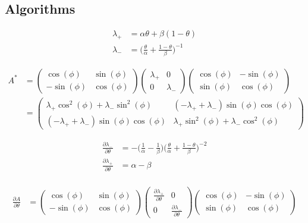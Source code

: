 \documentclass[11pt]{article}
\begin{document}
\newpage
\begin{appendix}
\section{Algorithms}
\begin{align*}
\lambda_+ &= \alpha\theta+\beta(1-\theta)\\[2ex]
\lambda_- &= \bigg(\frac{\theta}{\alpha} + \frac{1-\theta}{\beta}\bigg)^{-1}
\end{align*}

\begin{align*}
A^* &= \begin{pmatrix} \cos(\phi) & \sin(\phi)\\ -\sin(\phi) & \cos(\phi)\end{pmatrix}
\begin{pmatrix} \lambda_+ & 0\\ 0 & \lambda_-\end{pmatrix}
\begin{pmatrix} \cos(\phi) & -\sin(\phi)\\ \sin(\phi) & \cos(\phi)\end{pmatrix}\\[2ex]
&=\begin{pmatrix}
\lambda_+\cos^2(\phi)+\lambda_-\sin^2(\phi) & (-\lambda_++\lambda_-)\sin(\phi)\cos(\phi)
\\ (-\lambda_++\lambda_-)\sin(\phi)\cos(\phi) & \lambda_+\sin^2(\phi)+\lambda_-\cos^2(\phi)
\end{pmatrix}\end{align*}

\begin{align*}
\frac{\partial\lambda_-}{\partial\theta} &= -\bigg(\frac{1}{\alpha} - \frac{1}{\beta}\bigg)\bigg(\frac{\theta}{\alpha} + \frac{1-\theta}{\beta}\bigg)^{-2}\\
\frac{\partial\lambda_+}{\partial\theta} &= \alpha-\beta\\
\end{align*}

\begin{align*}
\frac{\partial A}{\partial\theta} &= \begin{pmatrix} \cos(\phi) & \sin(\phi)\\ -\sin(\phi) & \cos(\phi)\end{pmatrix}
\begin{pmatrix} \frac{\partial\lambda_+}{\partial\theta} & 0\\ 0 & \frac{\partial\lambda_-}{\partial\theta}\end{pmatrix}
\begin{pmatrix} \cos(\phi) & -\sin(\phi)\\ \sin(\phi) & \cos(\phi)\end{pmatrix}\\
\end{align*}


\end{appendix}
\end{document}
